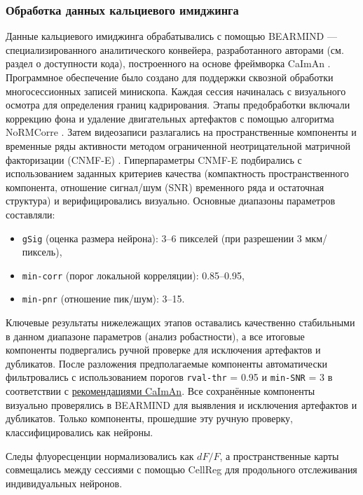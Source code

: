 \subsubsection{Обработка данных кальциевого имиджинга}
\label{sec:calcium_processing}
Данные кальциевого имиджинга обрабатывались с помощью BEARMIND --- специализированного аналитического конвейера, разработанного авторами (см. раздел о доступности кода), построенного на основе фреймворка CaImAn
\cite{Pnevmatikakis2016}. Программное обеспечение было создано для поддержки сквозной обработки многосессионных записей минископа.
Каждая сессия начиналась с визуального осмотра для определения границ кадрирования.
Этапы предобработки включали коррекцию фона и удаление двигательных артефактов с помощью алгоритма NoRMCorre \cite{Pnevmatikakis2017}. Затем видеозаписи разлагались на пространственные компоненты и временные ряды активности методом ограниченной неотрицательной матричной факторизации (CNMF-E) \cite{Zhou2018}. Гиперпараметры CNMF-E подбирались с использованием заданных критериев качества (компактность пространственного компонента, отношение сигнал/шум (SNR) временного ряда и остаточная структура) и верифицировались визуально. Основные диапазоны параметров составляли:
\begin{itemize}
\item \texttt{gSig} (оценка размера нейрона): 3--6 пикселей
(при разрешении 3 мкм/пиксель),
\item \texttt{min-corr} (порог локальной корреляции):
0.85--0.95,
\item \texttt{min-pnr} (отношение пик/шум): 3--15.
\end{itemize}
Ключевые результаты нижележащих этапов оставались качественно стабильными в данном диапазоне параметров (анализ робастности), а все итоговые компоненты подвергались ручной проверке для исключения артефактов и дубликатов.
После разложения предполагаемые компоненты автоматически фильтровались с использованием порогов \texttt{rval-thr} = 0.95 и \texttt{min-SNR} = 3 в соответствии с
\href{https://caiman.readthedocs.io/en/latest/CaImAn\_Tips.html}{рекомендациями CaImAn}.
Все сохранённые компоненты визуально проверялись в BEARMIND для выявления и исключения артефактов и дубликатов. Только компоненты, прошедшие эту ручную проверку, классифицировались как нейроны.

Следы флуоресценции нормализовались как $dF/F$, а пространственные карты совмещались между сессиями с помощью CellReg \cite{Sheintuch2017} для продольного отслеживания индивидуальных нейронов.

